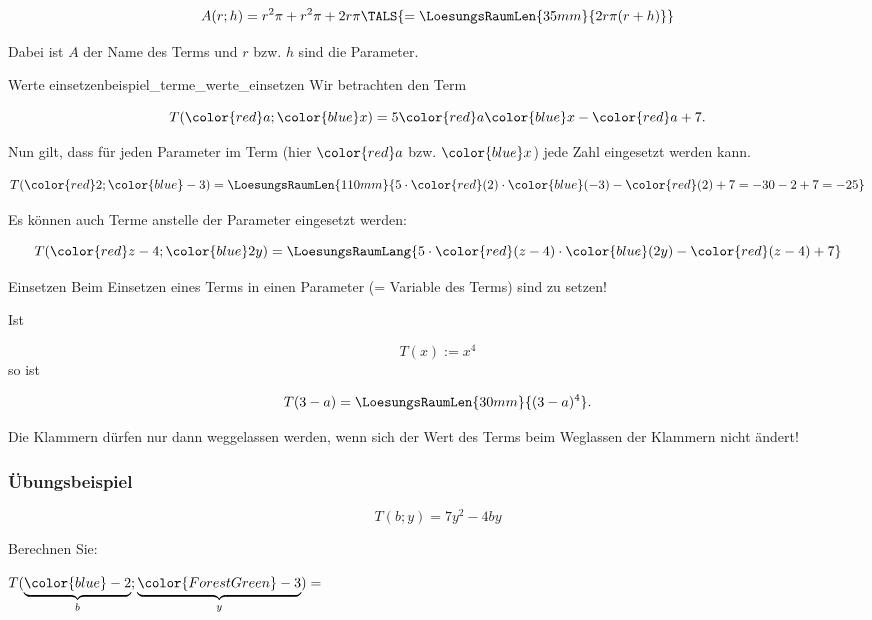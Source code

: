 $$A(r; h) = r^2\pi + r^2\pi + 2r\pi{} \TALS{ = \LoesungsRaumLen{35mm}{2r\pi(r+h)}}$$

Dabei ist $A$ der Name des Terms und $r$ bzw. $h$ sind die Parameter.
\vspace{3mm}
\begin{beispiel}{Werte einsetzen}{beispiel_terme_werte_einsetzen}
  Wir betrachten den Term

  $$T({\color{red}a}; {\color{blue}x}) = 5{\color{red}a}{\color{blue}x} - {\color{red}a} + 7.$$

  Nun gilt, dass für jeden Parameter im Term (hier ${\color{red}a}$
  bzw. ${\color{blue}x}$) jede Zahl eingesetzt
  werden kann.\leserluft{}

  $$T({\color{red}2}; {\color{blue}-3}) =
  \LoesungsRaumLen{110mm}{5\cdot{}{\color{red}(2)}\cdot{\color{blue}(-3)} -
    {\color{red}(2)} + 7 = -30  - 2 + 7 = -25}$$

  Es können auch Terme anstelle der Parameter eingesetzt
  werden:\leserluft{}

  $$T({\color{red}z-4}; {\color{blue}2y}) =
  \LoesungsRaumLang{5 \cdot{} {\color{red}(z-4)} \cdot {\color{blue}(2y)} - {\color{red}(z-4)} + 7}$$
\end{beispiel}

\begin{gesetz}{Einsetzen}{}
  Beim Einsetzen eines Terms in einen
  Parameter (= Variable des Terms) sind  zu setzen!

  Ist
  
  $$ T(x) := x^4$$
  so ist
  
  $$ T(3-a) = \LoesungsRaumLen{30mm}{(3-a)^4}.$$
  
Die Klammern dürfen nur dann weggelassen werden, wenn sich der Wert
des Terms beim Weglassen der Klammern nicht ändert!
\end{gesetz}
\newpage

\subsubsection{Übungsbeispiel}
$$T(b; y) = 7y^2 - 4by$$

Berechnen Sie:


$T(\underbrace{{\color{blue}-2}}_b; \underbrace{{\color{ForestGreen}-3}}_y) = $%




